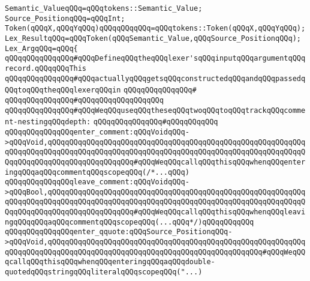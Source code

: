 \newline
\verb|Semantic_ValueqQQq=qQQqtokens::Semantic_Value;|\newline
\verb|Source_PositionqQQq=qQQqInt;|\newline
\newline
\verb|Token(qQQqX,qQQqYqQQq)qQQqqQQqqQQq=qQQqtokens::Token(qQQqX,qQQqYqQQq);|\newline
\verb|Lex_ResultqQQq=qQQqToken(qQQqSemantic_Value,qQQqSource_PositionqQQq);|\newline
\newline
\newline
\verb|Lex_ArgqQQq=qQQq{|\newline
\newline
\verb|qQQqqQQqqQQqqQQq#qQQqDefineqQQqtheqQQqlexer'sqQQqinputqQQqargumentqQQqrecord.qQQqqQQqThis|\newline
\verb|qQQqqQQqqQQqqQQq#qQQqactuallyqQQqgetsqQQqconstructedqQQqandqQQqpassedqQQqtoqQQqtheqQQqlexerqQQqin|\newline
\verb|qQQqqQQqqQQqqQQq#|\newline
\verb|qQQqqQQqqQQqqQQq#qQQqqQQqqQQqqQQqqQQq|\newline
\newline
\verb|qQQqqQQqqQQqqQQq#qQQqWeqQQquseqQQqtheseqQQqtwoqQQqtoqQQqtrackqQQqcomment-nestingqQQqdepth:|\newline
\verb|qQQqqQQqqQQqqQQq#qQQqqQQqqQQq|\newline
\verb|qQQqqQQqqQQqqQQqenter_comment:qQQqVoidqQQq->qQQqVoid,qQQqqQQqqQQqqQQqqQQqqQQqqQQqqQQqqQQqqQQqqQQqqQQqqQQqqQQqqQQqqQQqqQQqqQQqqQQqqQQqqQQqqQQqqQQqqQQqqQQqqQQqqQQqqQQqqQQqqQQqqQQqqQQqqQQqqQQqqQQqqQQqqQQqqQQqqQQqqQQq#qQQqWeqQQqcallqQQqthisqQQqwhenqQQqenteringqQQqaqQQqcommentqQQqscopeqQQq(/*...qQQq)|\newline
\verb|qQQqqQQqqQQqqQQqleave_comment:qQQqVoidqQQq->qQQqBool,qQQqqQQqqQQqqQQqqQQqqQQqqQQqqQQqqQQqqQQqqQQqqQQqqQQqqQQqqQQqqQQqqQQqqQQqqQQqqQQqqQQqqQQqqQQqqQQqqQQqqQQqqQQqqQQqqQQqqQQqqQQqqQQqqQQqqQQqqQQqqQQqqQQqqQQqqQQqqQQq#qQQqWeqQQqcallqQQqthisqQQqwhenqQQqleavingqQQqqQQqaqQQqcommentqQQqscopeqQQq(...qQQq*/)qQQqqQQqqQQq|\newline
\newline
\verb|qQQqqQQqqQQqqQQqenter_qquote:qQQqSource_PositionqQQq->qQQqVoid,qQQqqQQqqQQqqQQqqQQqqQQqqQQqqQQqqQQqqQQqqQQqqQQqqQQqqQQqqQQqqQQqqQQqqQQqqQQqqQQqqQQqqQQqqQQqqQQqqQQqqQQqqQQqqQQqqQQqqQQq#qQQqWeqQQqcallqQQqthisqQQqwhenqQQqenteringqQQqaqQQqdouble-quotedqQQqstringqQQqliteralqQQqscopeqQQq("...)|\newline

